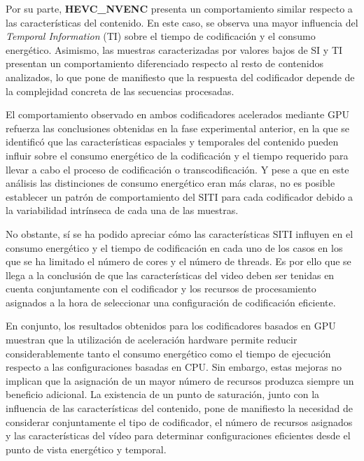  Por su parte, \textbf{HEVC\_NVENC} presenta un comportamiento similar respecto a las características del contenido. En este caso, se observa una mayor influencia del \textit{Temporal Information} (TI) sobre el tiempo de codificación y el consumo energético. Asimismo, las muestras caracterizadas por valores bajos de SI y TI presentan un comportamiento diferenciado respecto al resto de contenidos analizados, lo que pone de manifiesto que la respuesta del codificador depende de la complejidad concreta de las secuencias procesadas.

 El comportamiento observado en ambos codificadores acelerados mediante GPU refuerza las conclusiones obtenidas en la fase experimental anterior, en la que se identificó que las características espaciales y temporales del contenido pueden influir sobre el consumo energético de la codificación y el tiempo requerido para llevar a cabo el proceso de codificación o transcodificación. Y pese a que en este análisis las distinciones de consumo energético eran más claras, no es posible establecer un patrón de comportamiento del SITI para cada codificador debido a la variabilidad intrínseca de cada una de las muestras.

 No obstante, sí se ha podido apreciar cómo las características SITI influyen en el consumo energético y el tiempo de codificación en cada uno de los casos en los que se ha limitado el número de cores y el número de threads. Es por ello que se llega a la conclusión de que las características del video deben ser tenidas en cuenta conjuntamente con el codificador y los recursos de procesamiento asignados a la hora de seleccionar una configuración de codificación eficiente.

 En conjunto, los resultados obtenidos para los codificadores basados en GPU muestran que la utilización de aceleración hardware permite reducir considerablemente tanto el consumo energético como el tiempo de ejecución respecto a las configuraciones basadas en CPU. Sin embargo, estas mejoras no implican que la asignación de un mayor número de recursos produzca siempre un beneficio adicional. La existencia de un punto de saturación, junto con la influencia de las características del contenido, pone de manifiesto la necesidad de considerar conjuntamente el tipo de codificador, el número de recursos asignados y las características del vídeo para determinar configuraciones eficientes desde el punto de vista energético y temporal.